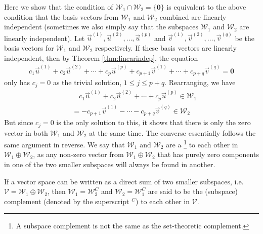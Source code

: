 Here we show that the condition of $\mathcal{W}_1 \cap \mathcal{W}_2 = \{\textbf{0}\}$ is equivalent to the above condition that the basis vectors from $\mathcal{W}_1$ and $\mathcal{W}_2$ combined are linearly independent (sometimes we also simply say that the subspaces $\mathcal{W}_1$ and $\mathcal{W}_2$ are linearly independent). Let $\vec{u}^{(1)}, \vec{u}^{(2)}, \ldots, \vec{u}^{(p)}$ and $\vec{v}^{(1)}, \vec{v}^{(2)}, \ldots, \vec{v}^{(q)}$ be the basis vectors for $\mathcal{W}_1$ and $\mathcal{W}_2$ respectively. If these basis vectors are linearly independent, then by Theorem \ref{thm:linearindep}, the equation
\begin{align*}
c_1\vec{u}^{(1)} + c_2\vec{u}^{(2)} + \cdots + c_p\vec{u}^{(p)} + c_{p+1}\vec{v}^{(1)} + \cdots + c_{p+q}\vec{v}^{(q)} = \textbf{0}
\end{align*}
only has $c_j = 0$ as the trivial solution, $1 \leq j \leq p+q$. Rearranging, we have
\begin{align*}
&\quad c_1\vec{u}^{(1)} + c_2\vec{u}^{(2)} + \cdots + c_p\vec{u}^{(p)} \in \mathcal{W}_1 \\
&= -c_{p+1}\vec{v}^{(1)} - \cdots - c_{p+q}\vec{v}^{(q)} \in \mathcal{W}_2
\end{align*}
But since $c_j = 0$ is the only solution to this, it shows that there is only the zero vector in both $\mathcal{W}_1$ and $\mathcal{W}_2$ at the same time. The converse essentially follows the same argument in reverse. We say that $\mathcal{W}_1$ and $\mathcal{W}_2$ are a \footnote{A subspace complement is not the same as the set-theoretic complement.} to each other in $\mathcal{W}_1 \oplus \mathcal{W}_2$, as any non-zero vector from $\mathcal{W}_1 \oplus \mathcal{W}_2$ that has purely zero components in one of the two smaller subspaces will always be found in another.
\begin{proper}
\label{proper:complement}
If a vector space can be written as a direct sum of two smaller subspaces, i.e. $\mathcal{V} = \mathcal{W}_1 \oplus \mathcal{W}_2$, then $\mathcal{W}_1 = \mathcal{W}_2^C$ and $\mathcal{W}_2 = \mathcal{W}_1^C$ are said to be the (subspace) complement (denoted by the superscript $^C$) to each other in $\mathcal{V}$.
\end{proper}
